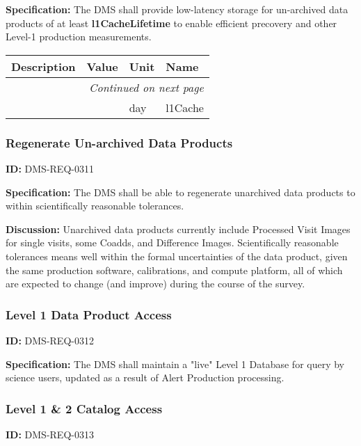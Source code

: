 \documentclass[SE,toc,lsstdraft]{lsstdoc}
\makeatletter
\newcommand{\paramname}[1]{\hspace{0pt}#1}
\newcommand{\unitname}[1]{\hspace{0pt}#1}
\newenvironment{parameters}[0]{%
\setlength\LTleft{0pt}
\setlength\LTright{\fill}
\begin{small}
\begin{longtable}[]{|p{0.5\textwidth}|l|p{0.6in}|p{1.74in}@{}|}

\hline \textbf{Description} & \textbf{Value} & \textbf{Unit} & \textbf{Name} \\ \hline
\endhead

\hline \multicolumn{4}{r}{\emph{Continued on next page}} \\
\endfoot

\hline\hline
\endlastfoot
}{%
\hline
\end{longtable}
\end{small}
}
\makeatother
\begin{document}
\textbf{Specification:} The DMS shall provide low-latency storage for un-archived data products of at least \textbf{l1CacheLifetime }to enable efficient precovery and other Level-1 production measurements.





\begin{parameters}

&

&
\unitname{%
day
}
&
\paramname{%
l1Cache
} \\\hline
\end{parameters}




\subsubsection{Regenerate Un-archived Data Products}

\label{DMS-REQ-0311}
\textbf{ID:} DMS-REQ-0311

\textbf{Specification:} The DMS shall be able to regenerate unarchived data products to within scientifically reasonable tolerances.

\textbf{Discussion: }Unarchived data products currently include Processed Visit Images for single visits, some Coadds, and Difference Images. Scientifically reasonable tolerances means well within the formal uncertainties of the data product, given the same production software, calibrations, and compute platform, all of which are expected to change (and improve) during the course of the survey.




\subsubsection{Level 1 Data Product Access}

\label{DMS-REQ-0312}
\textbf{ID:} DMS-REQ-0312

\textbf{Specification:} The DMS shall maintain a "live" Level 1 Database for query by science users, updated as a result of Alert Production processing.






\subsubsection{Level 1 \& 2 Catalog Access}

\label{DMS-REQ-0313}
\textbf{ID:} DMS-REQ-0313
\end{document}
